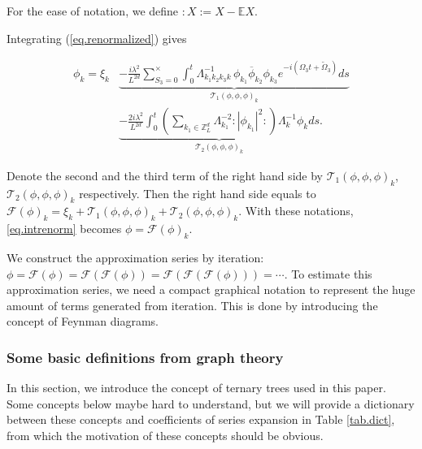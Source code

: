 For the ease of notation, we define $:X:=X-\mathbb{E}X$.

Integrating (\ref{eq.renormalized}) gives

\begin{equation}\label{eq.intrenorm}
\begin{split}
    \phi_k =\xi_k
    &\underbrace{-  \frac{i\lambda^2}{L^{2d}} \sum\limits^{\times}_{S_3=0} \int^{t}_0  \Lambda_{k_1k_2k_3k}^{-1}\,\phi_{k_1}\overline{\phi}_{k_2}  \phi_{k_3}e^{- i (\Omega_3t+\widetilde{\Omega}_3)} ds}_{\mathcal{T}_1(\phi,\phi,\phi)_k}
    \\
    &\underbrace{-  \frac{2i\lambda^2}{L^{2d}}  \int^{t}_0 \left(\sum\limits_{k_1\in \mathbb{Z}^d_L} \Lambda_{k_1}^{-2}:|\phi_{k_1}|^2: \right) \Lambda_{k}^{-1}\phi_{k} ds}_{\mathcal{T}_2(\phi,\phi,\phi)_k}.
\end{split}
\end{equation}


Denote the second and the third term of the right hand side by $\mathcal{T}_1(\phi,\phi,\phi)_k$, $\mathcal{T}_2(\phi,\phi,\phi)_k$ respectively. Then the right hand side equals to $\mathcal{F}(\phi)_k=\xi_k+\mathcal{T}_1(\phi,\phi,\phi)_k+\mathcal{T}_2(\phi,\phi,\phi)_k$. With these notations, \eqref{eq.intrenorm} becomes  $\phi=\mathcal{F}(\phi)_k$. 

We construct the approximation series by iteration: $\phi=\mathcal{F}(\phi)=\mathcal{F}(\mathcal{F}(\phi))=\mathcal{F}(\mathcal{F}(\mathcal{F}(\phi)))=\cdots$. To estimate this approximation series, we need a compact graphical notation to represent the huge amount of terms generated from iteration. This is done by introducing the concept of Feynman diagrams.

\subsubsection{Some basic definitions from graph theory} In this section, we introduce the concept of ternary trees used in this paper. Some concepts below maybe hard to understand, but we will 
provide a dictionary between these concepts and coefficients of series expansion in Table \ref{tab.dict}, from which the motivation of these concepts should be obvious.


